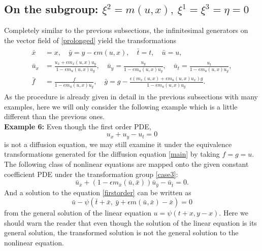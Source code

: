 \documentclass[a4paper]{article}
\def\bea{\begin{eqnarray}}
\def\eea{\end{eqnarray}}
\def\be{\begin{equation}}
\def\ee{\end{equation}}
\begin{document}
 \subsection{On the subgroup: $\xi^2=m(u,x),\ \xi^1=\xi^3=\eta=0$}
 Completely similar to the previous subsections, the infinitesimal generators  on the vector field of \eqref{prolonged}  
 yield the transformations
 \bea
 \label{case3}
 \begin{split}
 \bar x&=x,\quad \bar y=y-\epsilon m(u,x),\quad
  \bar t=t,\quad \bar u=u,\\
 \bar u_x&=\frac{u_x+\epsilon m_x(u,x)u_y}{1-\epsilon m_{u}(u,x)u_y}, \quad
  \bar u_y=\frac{u_y }{1-\epsilon m_{u}(u,x)u_y},\quad
  \bar u_t=\frac{u_t}{1-\epsilon m_{u}(u,x)u_y},\\
 \bar f&=\frac{ f} {1-\epsilon m_{u}(u,x)u_y}  ,\quad
 \bar g=g-\frac{\epsilon(m_x(u,x)+\epsilon m_u(u,x)u_x)g}{1-\epsilon m_{u}(u,x)u_y}.
 \end{split}
 \eea
 As the procedure is already given in detail in the previous subsections with many examples, here we will  only consider the following  example which is a little different than the previous ones. \\
{\bf Example 6:}
 Even though the first order PDE, $$u_x+u_y-u_t=0$$ is not a diffusion equation, we may still examine it under the  equivalence
 transformations generated for the diffusion equation \eqref{main} by  taking  $f=g=u$. The following class of  nonlinear equations are mapped onto the given constant coefficient PDE under the transformation group \eqref{case3}:  
\be\label{firstorder}
\bar u_{\bar x}+(1-\epsilon m_{\bar x}(\bar u,\bar x))\bar
u_{\bar y}-\bar u_{\bar t}=0.
\ee
And a solution to the equation \eqref{firstorder} can be written as
$$ \bar
u-\psi(\bar t+\bar x,\ \bar y+\epsilon m(\bar u,\bar x)-\bar x)=0 $$
from the general solution of the linear equation
$u=\psi(t+x,y-x)$. Here we should warn the reader that even though the solution of the linear equation is its general solution, the transformed solution is not the general solution to the nonlinear equation.
\end{document}
